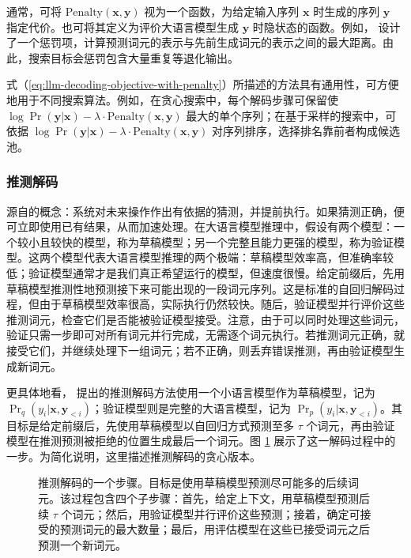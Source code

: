 通常，可将 $\mathrm{Penalty}(\mathbf{x},\mathbf{y})$ 视为一个函数，为给定输入序列 $\mathbf{x}$ 时生成的序列 $\mathbf{y}$ 指定代价。也可将其定义为评价大语言模型生成 $\mathbf{y}$ 时隐状态的函数。例如，\citet{su-etal:2022contrastive} 设计了一个惩罚项，计算预测词元的表示与先前生成词元的表示之间的最大距离。由此，搜索目标会惩罚包含大量重复等退化输出。

式（\ref{eq:llm-decoding-objective-with-penalty}）所描述的方法具有通用性，可方便地用于不同搜索算法。例如，在贪心搜索中，每个解码步骤可保留使 $\log \Pr(\mathbf{y}|\mathbf{x}) - \lambda \cdot \mathrm{Penalty}(\mathbf{x},\mathbf{y})$ 最大的单个序列；在基于采样的搜索中，可依据 $\log \Pr(\mathbf{y}|\mathbf{x}) - \lambda \cdot \mathrm{Penalty}(\mathbf{x},\mathbf{y})$ 对序列排序，选择排名靠前者构成候选池。

\subsubsection{推测解码}

源自的概念：系统对未来操作作出有依据的猜测，并提前执行。如果猜测正确，便可立即使用已有结果，从而加速处理。在大语言模型推理中，假设有两个模型：一个较小且较快的模型，称为草稿模型；另一个完整且能力更强的模型，称为验证模型。这两个模型代表大语言模型推理的两个极端：草稿模型效率高，但准确率较低；验证模型通常才是我们真正希望运行的模型，但速度很慢。给定前缀后，先用草稿模型推测性地预测接下来可能出现的一段词元序列。这是标准的自回归解码过程，但由于草稿模型效率很高，实际执行仍然较快。随后，验证模型并行评价这些推测词元，检查它们是否能被验证模型接受。注意，由于可以同时处理这些词元，验证只需一步即可对所有词元并行完成，无需逐个词元执行。若推测词元正确，就接受它们，并继续处理下一组词元；若不正确，则丢弃错误推测，再由验证模型生成新词元。

更具体地看，\citet{leviathan-etal:2023fast} 提出的推测解码方法使用一个小语言模型作为草稿模型，记为 $\Pr_q(y_i|\mathbf{x},\mathbf{y}_{<i})$；验证模型则是完整的大语言模型，记为 $\Pr_p(y_i|\mathbf{x},\mathbf{y}_{<i})$。其目标是给定前缀后，先使用草稿模型以自回归方式预测至多 $\tau$ 个词元，再由验证模型在推测预测被拒绝的位置生成最后一个词元。图 \ref{fig:speculative-decoding-one-step} 展示了这一解码过程中的一步。为简化说明，这里描述推测解码的贪心版本。

\begin{figure}[!t]
\centering

\vspace{-0.5cm} \caption{推测解码的一个步骤。目标是使用草稿模型预测尽可能多的后续词元。该过程包含四个子步骤：首先，给定上下文，用草稿模型预测后续 $\tau$ 个词元；然后，用验证模型并行评价这些预测；接着，确定可接受的预测词元的最大数量；最后，用评估模型在这些已接受词元之后预测一个新词元。}
\label{fig:speculative-decoding-one-step}
\end{figure}

